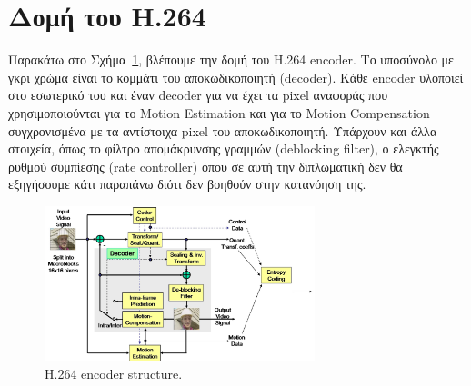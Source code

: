 \newpage

\section{Δομή του Η.264}
\label{section:sect28}

\indent Παρακάτω στο Σχήμα~\ref{fig:h264}, βλέπουμε την δομή του H.264 encoder. Το υποσύνολο με γκρι χρώμα είναι το κομμάτι του αποκωδικοποιητή (decoder). Κάθε encoder υλοποιεί στο εσωτερικό του και έναν decoder για να έχει τα pixel αναφοράς που χρησιμοποιούνται για το Motion Estimation και για το Motion Compensation συγχρονισμένα με τα αντίστοιχα pixel του αποκωδικοποιητή. Υπάρχουν και άλλα στοιχεία, όπως το φίλτρο απομάκρυνσης γραμμών (deblocking filter), ο ελεγκτής ρυθμού συμπίεσης (rate controller) όπου σε αυτή την διπλωματική δεν θα εξηγήσουμε κάτι παραπάνω διότι δεν βοηθούν στην κατανόηση της.

\begin{figure}[h]
    \centering
    \includegraphics[width=0.7\textwidth]{chapter2/h264.jpg}
    \caption{H.264 encoder structure. \cite{misc:structure}}
    \label{fig:h264}
\end{figure}

